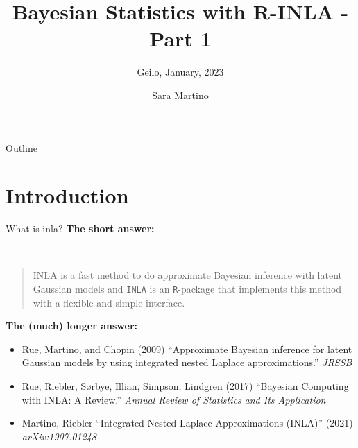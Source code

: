 \documentclass[
  ignorenonframetext,
]{beamer}
\title{Bayesian Statistics with R-INLA - Part 1}
\subtitle{Geilo, January, 2023}
\author{Sara Martino}
\date{}
\providecommand{\tightlist}{%
  \setlength{\itemsep}{0pt}\setlength{\parskip}{0pt}}
\begin{document}
\frame{\titlepage}

\begin{frame}
\end{frame}

\begin{frame}{Outline}
\protect\hypertarget{outline}{}
\tableofcontents[hideallsubsections]
\end{frame}

\hypertarget{introduction}{%
\section{Introduction}\label{introduction}}

\begin{frame}[fragile]{What is inla?}
\protect\hypertarget{what-is-inla}{}
\textbf{The short answer:}\\
\strut \\

\begin{quote}
INLA is a fast method to do approximate Bayesian inference with latent
Gaussian models and \texttt{INLA} is an \texttt{R}-package that
implements this method with a flexible and simple interface.
\end{quote}

\pause

\textbf{The (much) longer answer:}

\begin{itemize}
\tightlist
\item
  Rue, Martino, and Chopin (2009) ``Approximate Bayesian inference for
  latent Gaussian models by using integrated nested Laplace
  approximations.'' \emph{JRSSB}
\item
  Rue, Riebler, Sørbye, Illian, Simpson, Lindgren (2017) ``Bayesian
  Computing with INLA: A Review.'' \emph{Annual Review of Statistics and
  Its Application}
\item
  Martino, Riebler ``Integrated Nested Laplace Approximations (INLA)''
  (2021) \emph{arXiv:1907.01248}
\end{itemize}
\end{frame}
\end{document}
